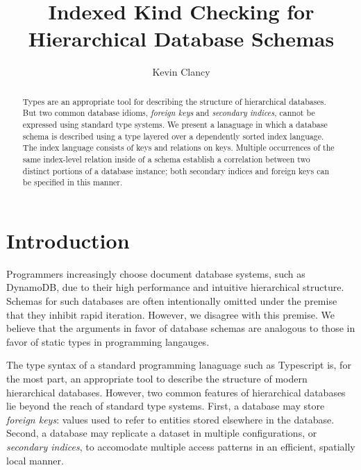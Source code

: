 \documentclass[sigplan,10pt,review,anonymous]{acmart}
\title{Indexed Kind Checking for Hierarchical Database Schemas}
\author{Kevin Clancy}
\begin{document}


\begin{abstract}

Types are an appropriate tool for describing the structure of hierarchical databases. But two common database idioms, \emph{foreign keys} and \emph{secondary indices}, cannot be expressed using standard type systems. We present a lanaguage in which a database schema is described using a type layered over a dependently sorted index language. The index language consists of keys and relations on keys. Multiple occurrences of the same index-level relation inside of a schema establish a correlation between two distinct portions of a database instance; both secondary indices and foreign keys can be specified in this manner.



\end{abstract}

\maketitle

\section{Introduction}

Programmers increasingly choose document database systems, such as DynamoDB, due to their high performance and intuitive hierarchical structure. Schemas for such databases are often intentionally omitted under the premise that they inhibit rapid iteration. However, we disagree with this premise. We believe that the arguments in favor of database schemas are analogous to those in favor of static types in programming langauges. 

The type syntax of a standard programming lanaguage such as Typescript is, for the most part, an appropriate tool to describe the structure of modern hierarchical databases. However, two common features of hierarchical databases lie beyond the reach of standard type systems. First, a database may store \emph{foreign keys}: values used to refer to entities stored elsewhere in the database. Second, a database may replicate a dataset in multiple configurations, or \emph{secondary indices}, to accomodate multiple access patterns in an efficient, spatially local manner. 
\end{document}
